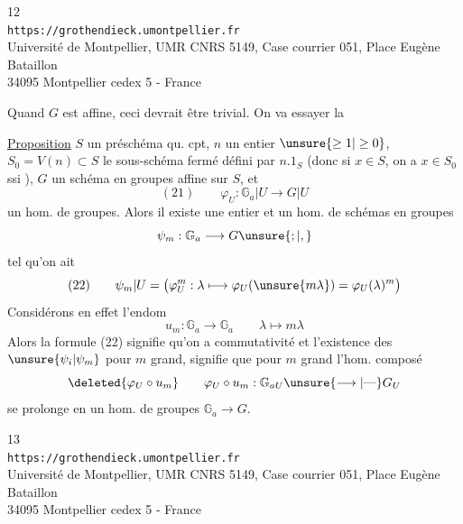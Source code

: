 \begin{center}
\small
12\\
\texttt{https://grothendieck.umontpellier.fr}\\
Université de Montpellier, UMR CNRS 5149, Case courrier 051, Place Eugène Bataillon\\
34095 Montpellier cedex 5 - France
\end{center}

Quand $G$ est affine, ceci devrait être trivial. On va essayer la

\uline{Proposition}  $S$ un préschéma qu. cpt, $n$ un entier $\unsure{\geq1|\geq0}$,  $S_0=V(n)\subset S$ le sous-schéma fermé défini par $n.1_S$ (donc si $x\in S$, on a $x\in S_0$ ssi   ),  $G$ un schéma en groupes affine  sur $S$, et
\[
(21)\qquad\varphi_U:\mathbb G_a|U\longrightarrow G|U
\]
un hom. de groupes.  Alors il existe une  entier    et un hom. de schémas en groupes
\[
\psi_m:\mathbb G_a\longrightarrow G\unsure{;|,}
\]
tel qu'on ait
\[
(22)\qquad\psi_m|U=\bigl(\varphi_U^m:\lambda\longmapsto\varphi_U(\unsure{m\lambda})=\varphi_U(\lambda)^m\bigr)
\]
Considérons en effet l'endom
\[
u_m:\mathbb G_a\longrightarrow\mathbb G_a\qquad\lambda\longmapsto m\lambda
\]
Alors la formule (22) signifie qu'on a commutativité
et l'existence des $\unsure{\psi_i|\psi_m}$ pour $m$ grand, signifie que pour $m$ grand l'hom. composé
\[
\deleted{\varphi_U\circ u_m}\qquad\varphi_U\circ u_m:\mathbb G_{aU}\unsure{\longrightarrow|\text{---}}G_U
\]
se prolonge en un hom. de groupes $\mathbb G_a\longrightarrow G$.

\begin{center}
\small
13\\
\texttt{https://grothendieck.umontpellier.fr}\\
Université de Montpellier, UMR CNRS 5149, Case courrier 051, Place Eugène Bataillon\\
34095 Montpellier cedex 5 - France
\end{center}

